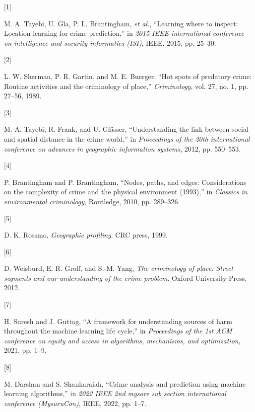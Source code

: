 \documentclass[10 pt,conference,final,]{IEEEtran}
\newlength{\cslhangindent}
\newlength{\csllabelwidth}
\newenvironment{CSLReferences}[2] %
 {\begin{list}{}{%
  \setlength{\itemindent}{0pt}
  \setlength{\leftmargin}{0pt}
  \setlength{\parsep}{0pt}
  \ifodd #1
   \setlength{\leftmargin}{\cslhangindent}
   \setlength{\itemindent}{-1\cslhangindent}
  \fi
  \setlength{\itemsep}{#2\baselineskip}}}
 {\end{list}}
\newcommand{\CSLLeftMargin}[1]{\parbox[t]{\csllabelwidth}{#1}}
\newcommand{\CSLRightInline}[1]{\parbox[t]{\linewidth - \csllabelwidth}{#1}\break}
\begin{document}
\label{refs}
\begin{CSLReferences}{0}{0}
\CSLLeftMargin{{[}1{]} }%
\CSLRightInline{M. A. Tayebi, U. Gla, P. L. Brantingham, \emph{et al.},
{``Learning where to inspect: Location learning for crime prediction,''}
in \emph{2015 IEEE international conference on intelligence and security
informatics (ISI)}, IEEE, 2015, pp. 25--30.}

\CSLLeftMargin{{[}2{]} }%
\CSLRightInline{L. W. Sherman, P. R. Gartin, and M. E. Buerger, {``Hot
spots of predatory crime: Routine activities and the criminology of
place,''} \emph{Criminology}, vol. 27, no. 1, pp. 27--56, 1989.}

\CSLLeftMargin{{[}3{]} }%
\CSLRightInline{M. A. Tayebi, R. Frank, and U. Glässer, {``Understanding
the link between social and spatial distance in the crime world,''} in
\emph{Proceedings of the 20th international conference on advances in
geographic information systems}, 2012, pp. 550--553.}

\CSLLeftMargin{{[}4{]} }%
\CSLRightInline{P. Brantingham and P. Brantingham, {``Nodes, paths, and
edges: Considerations on the complexity of crime and the physical
environment (1993),''} in \emph{Classics in environmental criminology},
Routledge, 2010, pp. 289--326.}

\CSLLeftMargin{{[}5{]} }%
\CSLRightInline{D. K. Rossmo, \emph{Geographic profiling}. CRC press,
1999.}

\CSLLeftMargin{{[}6{]} }%
\CSLRightInline{D. Weisburd, E. R. Groff, and S.-M. Yang, \emph{The
criminology of place: Street segments and our understanding of the crime
problem}. Oxford University Press, 2012.}

\CSLLeftMargin{{[}7{]} }%
\CSLRightInline{H. Suresh and J. Guttag, {``A framework for
understanding sources of harm throughout the machine learning life
cycle,''} in \emph{Proceedings of the 1st ACM conference on equity and
access in algorithms, mechanisms, and optimization}, 2021, pp. 1--9.}

\CSLLeftMargin{{[}8{]} }%
\CSLRightInline{M. Darshan and S. Shankaraiah, {``Crime analysis and
prediction using machine learning algorithms,''} in \emph{2022 IEEE 2nd
mysore sub section international conference (MysuruCon)}, IEEE, 2022,
pp. 1--7.}


\end{CSLReferences}
\end{document}
